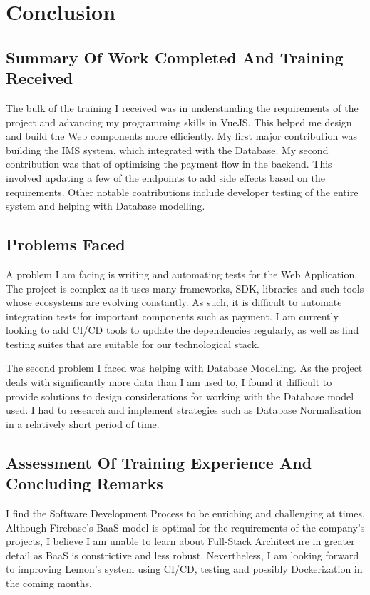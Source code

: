 \section{Conclusion}
\subsection{Summary Of Work Completed And Training Received}
\noindent
The bulk of the training I received was in understanding the requirements of the project and advancing my programming skills in VueJS. This helped
me design and build the Web components more efficiently.
\noindent
My first major contribution was building the IMS system, which integrated with the Database.
\noindent
My second contribution was that of optimising the payment flow in the backend. This involved updating a few of the endpoints to add side effects based on the requirements.
\noindent
Other notable contributions include developer testing of the entire system and helping with Database modelling.
 
\subsection{Problems Faced}
\noindent
A problem I am facing is writing and automating tests for the Web Application. The project is complex as it uses many frameworks, SDK, libraries
and such tools whose ecosystems are evolving constantly. As such, it is difficult to automate integration tests for important components such as
payment. I am currently looking to add CI/CD tools to update the dependencies regularly, as well as find testing suites that
are suitable for our technological stack.

\noindent
The second problem I faced was helping with Database Modelling. As the project deals with significantly more data than
I am used to, I found it difficult to provide solutions to design considerations for working with the Database model used. I had to 
research and implement strategies such as Database Normalisation in a relatively short period of time.

\subsection{Assessment Of Training Experience And Concluding Remarks}
\noindent
I find the Software Development Process to be enriching and challenging at times. Although Firebase's BaaS model is optimal for 
the requirements of the company's projects, I believe I am unable to learn about Full-Stack Architecture in greater detail as BaaS is constrictive and less robust.
Nevertheless, I am looking forward to improving Lemon's system using CI/CD, testing and possibly Dockerization in the coming months.
